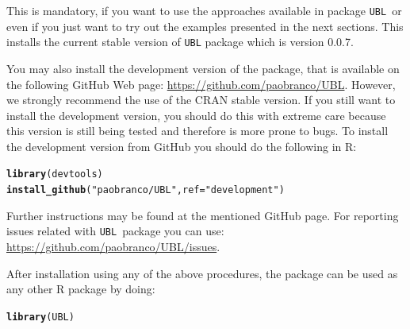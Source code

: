 \documentclass[10pt,a4paper]{article}\usepackage[]{graphicx}\usepackage[]{color}
\makeatletter
\newcommand{\hlstr}[1]{\textcolor[rgb]{0.192,0.494,0.8}{#1}}%
\newcommand{\hlstd}[1]{\textcolor[rgb]{0.345,0.345,0.345}{#1}}%
\newcommand{\hlkwc}[1]{\textcolor[rgb]{0.333,0.667,0.333}{#1}}%
\newcommand{\hlkwd}[1]{\textcolor[rgb]{0.737,0.353,0.396}{\textbf{#1}}}%
\newenvironment{kframe}{%
 \def\at@end@of@kframe{}%
 \ifinner\ifhmode%
  \def\at@end@of@kframe{\end{minipage}}%
  \begin{minipage}{\columnwidth}%
 \fi\fi%
 \def\FrameCommand##1{\hskip\@totalleftmargin \hskip-\fboxsep
 \colorbox{shadecolor}{##1}\hskip-\fboxsep
     \hskip-\linewidth \hskip-\@totalleftmargin \hskip\columnwidth}%
 \MakeFramed {\advance\hsize-\width
   \@totalleftmargin\z@ \linewidth\hsize
   \@setminipage}}%
 {\par\unskip\endMakeFramed%
 \at@end@of@kframe}
\newenvironment{knitrout}{}{} %
\newcommand{\pUBL}{package \texttt{UBL}\ }
\newcommand{\UBLp}{\texttt{UBL}\ package  }
\newcommand{\version}{0.0.7}
\makeatother
\begin{document}
This is mandatory, if you want to use the approaches available in \pUBL or even if you just want to try out the examples presented in the next sections. This installs the current stable version of \texttt{UBL} package which is version \version.

You may also install the development version of the package, that is available on the following GitHub Web page: \url{https://github.com/paobranco/UBL}. However, we strongly recommend the use of the CRAN stable version. If you still want to install the development version, you should do this with extreme care because this version is still being tested and therefore is more prone to bugs.
To install the development version from GitHub you should do the following in R:

\begin{knitrout}\footnotesize
{}\color{fgcolor}\begin{kframe}
\begin{alltt}
\hlkwd{library}\hlstd{(devtools)}
\hlkwd{install_github}\hlstd{(}\hlstr{"paobranco/UBL"}\hlstd{,}\hlkwc{ref}\hlstd{=}\hlstr{"development"}\hlstd{)}
\end{alltt}
\end{kframe}
\end{knitrout}

Further instructions may be found at the mentioned GitHub page. 
For reporting issues related with \UBLp you can use: \url{https://github.com/paobranco/UBL/issues}.


After installation using any of the above procedures, the package can be used as any other R package by doing:

\begin{knitrout}\footnotesize
{}\color{fgcolor}\begin{kframe}
\begin{alltt}
\hlkwd{library}\hlstd{(UBL)}
\end{alltt}
\end{kframe}
\end{knitrout}

\end{document}
